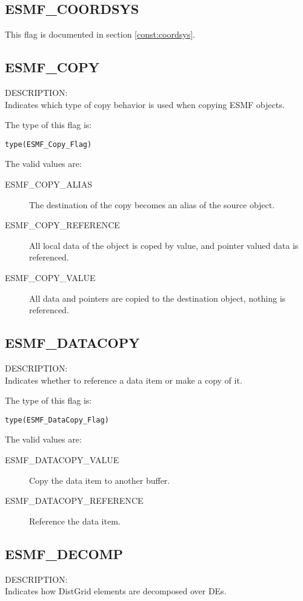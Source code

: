 \subsection{ESMF\_COORDSYS}
This flag is documented in section \ref{const:coordsys}.

\subsection{ESMF\_COPY}
\label{const:copy}
{\sf DESCRIPTION:\\}
Indicates which type of copy behavior is used when copying ESMF objects.

The type of this flag is:

{\tt type(ESMF\_Copy\_Flag)}

The valid values are:
\begin{description}
	\item[ESMF\_COPY\_ALIAS]
	The destination of the copy becomes an alias of the source object.
	\item[ESMF\_COPY\_REFERENCE]
	All local data of the object is coped by value, and pointer valued data is referenced.
	\item[ESMF\_COPY\_VALUE]
	All data and pointers are copied to the destination object, nothing is referenced.
\end{description}

\subsection{ESMF\_DATACOPY}
\label{const:datacopyflag}
{\sf DESCRIPTION:\\}
Indicates whether to reference a data item or make a copy of it.

The type of this flag is:

{\tt type(ESMF\_DataCopy\_Flag)}

The valid values are:
\begin{description}
\item [ESMF\_DATACOPY\_VALUE]
      Copy the data item to another buffer.
\item [ESMF\_DATACOPY\_REFERENCE]
      Reference the data item.
\end{description}

\subsection{ESMF\_DECOMP}
\label{const:decompflag}
{\sf DESCRIPTION:\\}
Indicates how DistGrid elements are decomposed over DEs.

